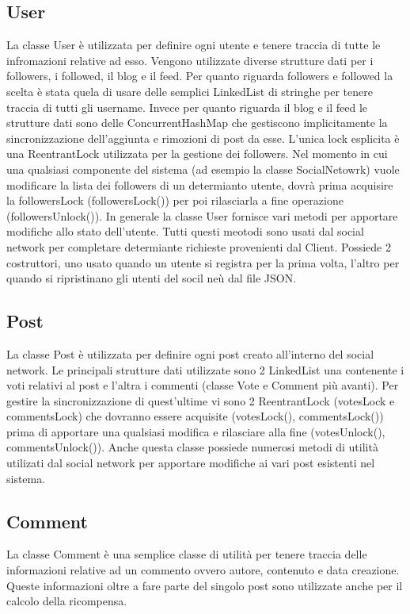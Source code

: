 \documentclass[11pt, a4paper, oneside]{article}
\begin{document}
\subsection{User}
La classe User è utilizzata per definire ogni utente e tenere traccia di tutte le infromazioni relative ad esso. Vengono utilizzate diverse strutture dati
per i followers, i followed, il blog e il feed. Per quanto riguarda followers e followed la scelta è stata quela di usare delle semplici LinkedList di stringhe
per tenere traccia di tutti gli username. Invece per quanto riguarda il blog e il feed le strutture dati sono delle ConcurrentHashMap che gestiscono implicitamente
la sincronizzazione dell'aggiunta e rimozioni di post da esse. L'unica lock esplicita è una ReentrantLock utilizzata per la gestione dei followers. Nel momento
in cui una qualsiasi componente del sistema (ad esempio la classe SocialNetowrk) vuole modificare la lista dei followers di un determianto utente, dovrà prima 
acquisire la followersLock (followersLock()) per poi rilasciarla a fine operazione (followersUnlock()).
In generale la classe User fornisce vari metodi per apportare modifiche allo stato dell'utente. Tutti questi meotodi sono usati dal social network per completare determiante
richieste provenienti dal Client. Possiede 2 costruttori, uno usato quando un utente si registra per la prima volta, l'altro per quando si ripristinano gli utenti 
del socil neù dal file JSON.
\subsection{Post}
La classe Post è utilizzata per definire ogni post creato all'interno del social network. Le principali strutture dati utilizzate sono 2 LinkedList una contenente 
i voti relativi al post e l'altra i commenti (classe Vote e Comment più avanti). Per gestire la sincronizzazione di quest'ultime vi sono 2 ReentrantLock (votesLock e commentsLock) che dovranno essere 
acquisite (votesLock(), commentsLock()) prima di apportare una qualsiasi modifica e rilasciare alla fine (votesUnlock(), commentsUnlock()). Anche questa classe 
possiede numerosi metodi di utilità utilizati dal social network per apportare modifiche ai vari post esistenti nel sistema. 
\subsection{Comment}
La classe Comment è una semplice classe di utilità per tenere traccia delle informazioni relative ad un commento ovvero autore, contenuto e data creazione.
Queste informazioni oltre a fare parte del singolo post sono utilizzate anche per il calcolo della ricompensa.
\end{document}
